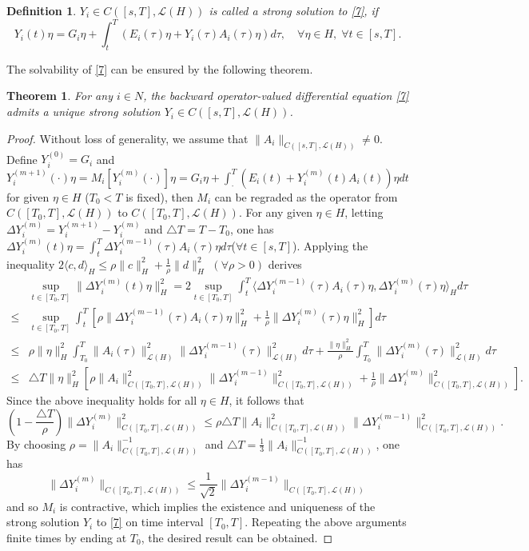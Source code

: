\documentclass[10pt]{article}
\newtheorem{thm}{Theorem}[section]
\newtheorem{defn}{Definition}[section]
\begin{document}
\begin{defn}\label{22}
$Y_i\in C([s,T],\mathcal{L}(H))$ is called a strong solution to \eqref{7}, if
$$
Y_i(t)\eta = G_i\eta + \int_t^T (E_i(\tau)\eta + Y_i(\tau)A_i(\tau)\eta) d\tau, \quad \forall \eta\in H,\;\forall t\in[s,T].
$$
\end{defn}
The solvability of \eqref{7} can be ensured by the following theorem.
\begin{thm}\label{23}
For any $i\in N$, the backward operator-valued differential equation  \eqref{7} admits a unique strong solution $Y_i\in C([s,T],\mathcal{L}(H))$.
\end{thm}
\begin{proof}
Without loss of generality, we assume that $\|A_i\|_{ C([s,T],\mathcal{L}(H))}\neq 0$. Define $Y_i^{(0)}=G_i$ and 
$
Y_i^{(m+1)}(\cdot)\eta=M_i[Y_i^{(m)}(\cdot)]\eta=G_i\eta+\int_{\cdot}^T(E_i(t)+Y_i^{(m)}(t)A_i(t))\eta dt
$
for given $\eta\in H$ ($T_0<T$ is fixed), then  $M_i$ can be regraded as the operator from $C([T_0,T],\mathcal{L}(H))$ to $C([T_0,T],\mathcal{L}(H))$.
For any given $\eta\in H$, letting $\Delta Y_i^{(m)}=Y_i^{(m+1)}-Y_i^{(m)}$ and $\triangle T=T-T_0$, one has
$\Delta Y_i^{(m)}(t)\eta=\int_t^T\Delta Y_i^{(m-1)}(\tau)A_i(\tau)\eta d\tau$($\forall t\in[s,T]$).
Applying the inequality $2\langle c,d\rangle_H\leq \rho \|c\|_H^2+\frac{1}{\rho}\|d\|_H^2$ $(\forall \rho>0)$ derives
\begin{align*}
 & \sup_{t\in[T_0,T]}\|\Delta Y_i^{(m)}(t)\eta\|_H^2
=2\sup_{t\in[T_0,T]}\int_t^T\langle\Delta Y_i^{(m-1)}(\tau)A_i(\tau)\eta, \Delta Y_i^{(m)}(\tau)\eta\rangle_H d\tau\\
\leq&\sup_{t\in[T_0,T]}\int_t^T[\rho\|\Delta Y_i^{(m-1)}(\tau)A_i(\tau)\eta\|_H^2+
  \frac{1}{\rho}\|\Delta Y_i^{(m)}(\tau)\eta\|_H^2]d\tau\\
\leq&\rho\|\eta\|_H^2\int_{T_0}^T\|A_i(\tau)\|^2_{\mathcal{L}(H)}\|\Delta Y_i^{(m-1)}(\tau)\|^2_{\mathcal{L}(H)}d\tau+
\frac{\|\eta\|_H^2}{\rho}\int_{T_0}^T\|\Delta Y_i^{(m)}(\tau)\|_{\mathcal{L}(H)}^2d\tau\\
\leq& \triangle T\|\eta\|_H^2[\rho\|A_i\|^2_{C([T_0,T],\mathcal{L}(H))}\|\Delta Y_i^{(m-1)}\|^2_{C([T_0,T],\mathcal{L}(H))}+\frac{1}{\rho}\|\Delta Y_i^{(m)}\|^2_{C([T_0,T],\mathcal{L}(H))}].
\end{align*}
Since the above inequality holds for all $\eta\in H$, it follows that
$$
(1-\frac{\triangle T}{\rho})\|\Delta Y_i^{(m)}\|^2_{C([T_0,T],\mathcal{L}(H))}\leq\rho \triangle T\|A_i\|^2_{C([T_0,T],\mathcal{L}(H))}\|\Delta Y_i^{(m-1)}\|^2_{C([T_0,T],\mathcal{L}(H))}.
$$
By choosing $\rho=\|A_i\|^{-1}_{C([T_0,T],\mathcal{L}(H))}$ and $\triangle T=\frac{1}{3}\|A_i\|^{-1}_{C([T_0,T],\mathcal{L}(H))}$, one has
$$
\|\Delta Y_i^{(m)}\|_{C([T_0,T],\mathcal{L}(H))}\leq \frac{1}{\sqrt{2}}\|\Delta Y_i^{(m-1)}\|_{C([T_0,T],\mathcal{L}(H))}
$$
and so $M_i$ is contractive, which implies the existence and uniqueness of the strong solution $Y_i$ to \eqref{7} on time interval $[T_0,T]$. Repeating the above arguments finite times by ending at $T_0$, the desired result can be obtained.
\end{proof}
\end{document}
